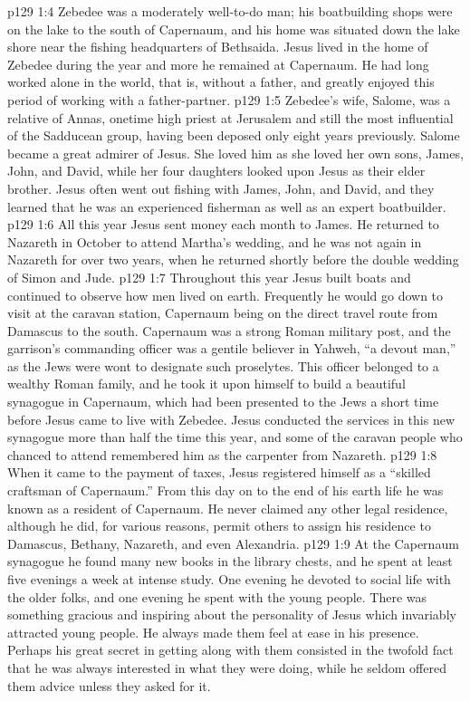 \vs p129 1:4 Zebedee was a moderately well\hyp{}to\hyp{}do man; his boatbuilding shops were on the lake to the south of Capernaum, and his home was situated down the lake shore near the fishing headquarters of Bethsaida. Jesus lived in the home of Zebedee during the year and more he remained at Capernaum. He had long worked alone in the world, that is, without a father, and greatly enjoyed this period of working with a father\hyp{}partner.
\vs p129 1:5 Zebedee’s wife, Salome, was a relative of Annas, onetime high priest at Jerusalem and still the most influential of the Sadducean group, having been deposed only eight years previously. Salome became a great admirer of Jesus. She loved him as she loved her own sons, James, John, and David, while her four daughters looked upon Jesus as their elder brother. Jesus often went out fishing with James, John, and David, and they learned that he was an experienced fisherman as well as an expert boatbuilder.
\pc \vs p129 1:6 All this year Jesus sent money each month to James. He returned to Nazareth in October to attend Martha’s wedding, and he was not again in Nazareth for over two years, when he returned shortly before the double wedding of Simon and Jude.
\pc \vs p129 1:7 Throughout this year Jesus built boats and continued to observe how men lived on earth. Frequently he would go down to visit at the caravan station, Capernaum being on the direct travel route from Damascus to the south. Capernaum was a strong Roman military post, and the garrison’s commanding officer was a gentile believer in Yahweh, “a devout man,” as the Jews were wont to designate such proselytes. This officer belonged to a wealthy Roman family, and he took it upon himself to build a beautiful synagogue in Capernaum, which had been presented to the Jews a short time before Jesus came to live with Zebedee. Jesus conducted the services in this new synagogue more than half the time this year, and some of the caravan people who chanced to attend remembered him as the carpenter from Nazareth.
\vs p129 1:8 When it came to the payment of taxes, Jesus registered himself as a “skilled craftsman of Capernaum.” From this day on to the end of his earth life he was known as a resident of Capernaum. He never claimed any other legal residence, although he did, for various reasons, permit others to assign his residence to Damascus, Bethany, Nazareth, and even Alexandria.
\vs p129 1:9 At the Capernaum synagogue he found many new books in the library chests, and he spent at least five evenings a week at intense study. One evening he devoted to social life with the older folks, and one evening he spent with the young people. There was something gracious and inspiring about the personality of Jesus which invariably attracted young people. He always made them feel at ease in his presence. Perhaps his great secret in getting along with them consisted in the twofold fact that he was always interested in what they were doing, while he seldom offered them advice unless they asked for it.
